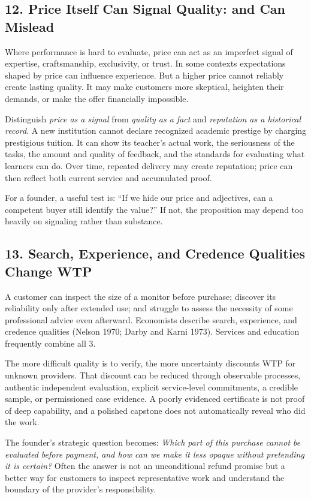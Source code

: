 \subsection*{12. Price Itself Can Signal Quality: and Can Mislead}

Where performance is hard to evaluate, price can act as an imperfect signal of expertise, craftsmanship, exclusivity, or trust. In some contexts expectations shaped by price can influence experience. But a higher price cannot reliably create lasting quality. It may make customers more skeptical, heighten their demands, or make the offer financially impossible.

Distinguish \emph{price as a signal} from \emph{quality as a fact} and \emph{reputation as a historical record}. A new institution cannot declare recognized academic prestige by charging prestigious tuition. It can show its teacher's actual work, the seriousness of the tasks, the amount and quality of feedback, and the standards for evaluating what learners can do. Over time, repeated delivery may create reputation; price can then reflect both current service and accumulated proof.

For a founder, a useful test is: ``If we hide our price and adjectives, can a competent buyer still identify the value?'' If not, the proposition may depend too heavily on signaling rather than substance.

\subsection*{13. Search, Experience, and Credence Qualities Change WTP}

A customer can inspect the size of a monitor before purchase; discover its reliability only after extended use; and struggle to assess the necessity of some professional advice even afterward. Economists describe search, experience, and credence qualities (Nelson 1970; Darby and Karni 1973). Services and education frequently combine all 3.

The more difficult quality is to verify, the more uncertainty discounts WTP for unknown providers. That discount can be reduced through observable processes, authentic independent evaluation, explicit service-level commitments, a credible sample, or permissioned case evidence. A poorly evidenced certificate is not proof of deep capability, and a polished capstone does not automatically reveal who did the work.

The founder's strategic question becomes: \emph{Which part of this purchase cannot be evaluated before payment, and how can we make it less opaque without pretending it is certain?} Often the answer is not an unconditional refund promise but a better way for customers to inspect representative work and understand the boundary of the provider's responsibility.

